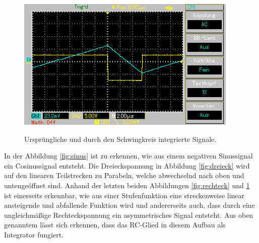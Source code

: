\begin{figure}[H]
\begin{minipage}{0.48\textwidth}
        \label{fig:rechteck}
        \vspace{1em}
        \includegraphics[width=\textwidth]{content/Grafiken/MAP004.png}
        \label{fig:pwm}
        \vspace{1em}
    \end{minipage}
    \caption{Ursprüngliche und durch den Schwingkreis integrierte Signale.}
\end{figure}
\noindent
In der Abbildung \ref{fig:sinus} ist zu erkennen, wie aus einem negativen Sinussignal ein Cosinussignal entsteht.
Die Dreieckspannung in Abbildung \ref{fig:dreieck} wird auf den linearen Teilstrecken zu Parabeln, welche abwechselnd nach oben und untengeöffnet sind.
Anhand der letzten beiden Abbildungen \ref{fig:rechteck} und \ref{fig:pwm} ist einerseits erkennbar, wie aus einer Stufenfunktion eine streckenweise linear ansteigende und abfallende Funktion wird und andererseits auch, dass durch eine ungleichmäßige Rechteckspannung ein asymmetrisches Signal entsteht.
Aus oben genanntem lässt sich erkennen, dass das RC-Glied in diesem Aufbau als Integrator fungiert.
